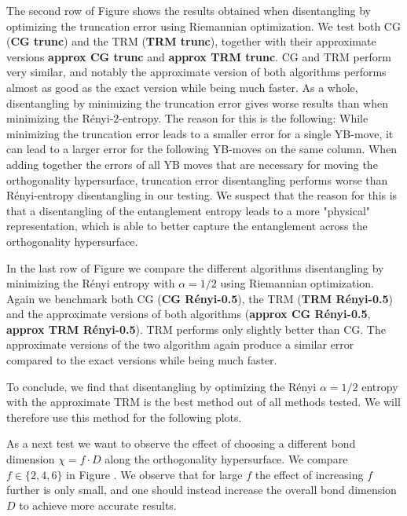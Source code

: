 The second row of Figure  shows the results obtained when disentangling by optimizing the truncation error using Riemannian optimization.  We test both CG (\textbf{CG trunc}) and the TRM (\textbf{TRM trunc}), together with their approximate versions \textbf{approx CG trunc} and \textbf{approx TRM trunc}. CG and TRM perform very similar, and notably the approximate version of both algorithms performs almost as good as the exact version while being much faster. As a whole, disentangling by minimizing the truncation error gives worse results than when minimizing the Rényi-$2$-entropy. The reason for this is the following: While minimizing the truncation error leads to a smaller error for a single YB-move, it can lead to a larger error for the following YB-moves on the same column. When adding together the errors of all YB moves that are necessary for moving the orthogonality hypersurface, truncation error disentangling performs worse than Rényi-entropy disentangling in our testing. We suspect that the reason for this is that a disentangling of the entanglement entropy leads to a more "physical" representation, which is able to better capture the entanglement across the orthogonality hypersurface. \par
In the last row of Figure  we compare the different algorithms disentangling by minimizing the Rényi entropy with $\alpha = 1/2$ using Riemannian optimization. Again we benchmark both CG (\textbf{CG Rényi-0.5}), the TRM (\textbf{TRM Rényi-0.5}) and the approximate versions of both algorithms (\textbf{approx CG Rényi-0.5}, \textbf{approx TRM Rényi-0.5}). TRM performs only slightly better than CG. The approximate versions of the two algorithm again produce a similar error compared to the exact versions while being much faster. \par
To conclude, we find that disentangling by optimizing the Rényi $\alpha=1/2$ entropy with the approximate TRM is the best method out of all methods tested. We will therefore use this method for the following plots. \par
%

%
As a next test we want to observe the effect of choosing a different bond dimension $\chi = f\cdot D$ along the orthogonality hypersurface. We compare $f \in\{2, 4, 6\}$ in Figure . We observe that for large $f$ the effect of increasing $f$ further is only small, and one should instead increase the overall bond dimension $D$ to achieve more accurate results. \par
